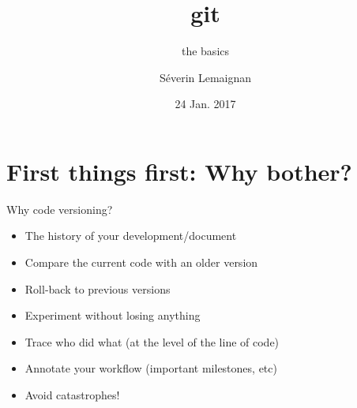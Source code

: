 \documentclass[compress]{beamer}
\title{\bf git}
\subtitle{the basics}
\date{24 Jan. 2017}
\author{Séverin Lemaignan}
\institute{Centre for Robotics \& Neural
Systems\\{\bf Plymouth University}}
\begin{document}
\maketitle


\section{First things first: Why bother?}


{
    \begin{frame}[plain]{}
    \end{frame}
}

\begin{frame}{Why code versioning?}

    \begin{itemize}
        \item The history of your development/document
        \item Compare the current code with an older version
        \item Roll-back to previous versions
        \item Experiment without losing anything
        \item Trace who did what (at the level of the line of code)
        \item Annotate your workflow (important milestones, etc)
        \item Avoid catastrophes!
    \end{itemize}
\end{frame}
\end{document}
